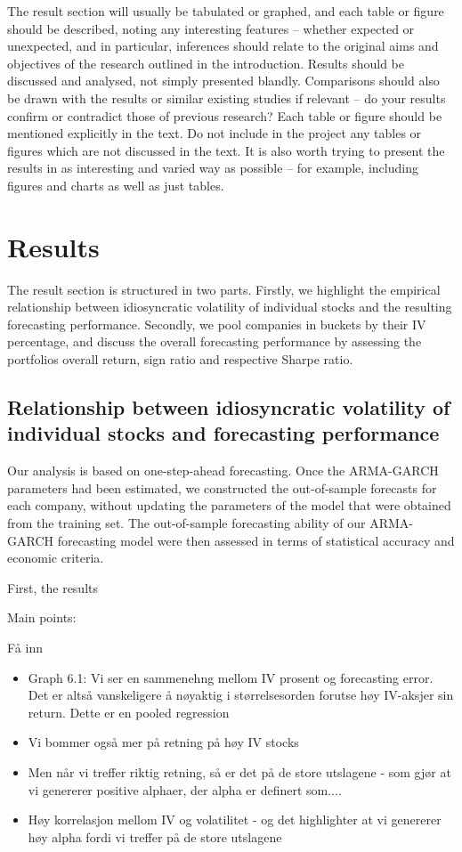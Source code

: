 The result section will usually be tabulated or graphed, and each table or figure should be described, noting any interesting features – whether expected or unexpected, and in particular, inferences should relate to the original aims and objectives of the research outlined in the introduction. Results should be discussed and analysed, not simply presented blandly. Comparisons should also be drawn with the results or similar existing studies if relevant – do your results confirm or contradict those of previous research? Each table or figure should be mentioned explicitly in the text. Do not include in the project any tables or figures which are not discussed in the text. It is also worth trying to present the results in as interesting and varied way as possible – for example, including figures and charts as well as just tables.


\chapter{Results}
The result section is structured in two parts. Firstly, we highlight the empirical relationship between idiosyncratic volatility of individual stocks and the resulting forecasting performance. Secondly, we pool companies in buckets by their IV percentage, and discuss the overall forecasting performance by assessing the portfolios overall return, sign ratio and respective Sharpe ratio.

\section*{Relationship between idiosyncratic volatility of individual stocks and forecasting performance}

Our analysis is based on one-step-ahead forecasting. Once the ARMA-GARCH parameters had been estimated, we constructed the out-of-sample forecasts for each company, without updating the parameters of the model that were
obtained from the training set. The out-of-sample forecasting ability of our ARMA-GARCH forecasting model were then assessed in terms of statistical accuracy and economic criteria. 

First, the results 


Main points:

Få inn 
\begin{itemize}
    \item Graph 6.1: Vi ser en sammenehng mellom IV prosent og forecasting error. Det er altså vanskeligere å nøyaktig i størrelsesorden forutse høy IV-aksjer sin return. Dette er en pooled regression
    \item Vi bommer også mer på retning på høy IV stocks
    \item Men når vi treffer riktig retning, så er det på de store utslagene - som gjør at vi genererer positive alphaer, der alpha er definert som....
    \item Høy korrelasjon mellom IV og volatilitet - og det highlighter at vi genererer høy alpha fordi vi treffer på de store utslagene
\end{itemize}

